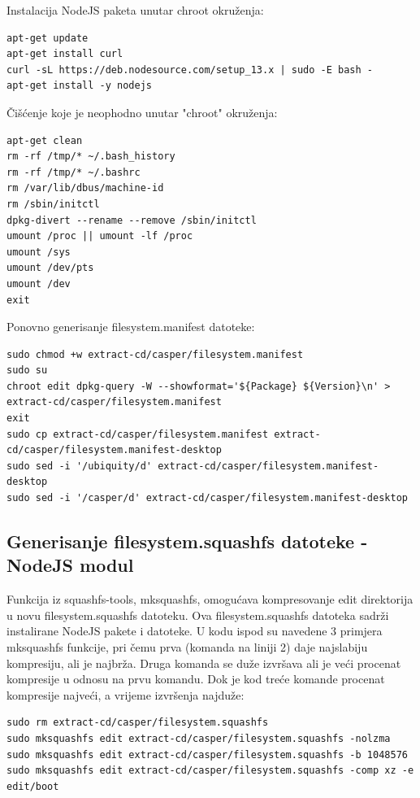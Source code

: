 \documentclass[12pt,vi]{mitthesis}
\begin{document}
\noindent
Instalacija NodeJS paketa unutar chroot okruženja:
\begin{lstlisting}[style=BashInputStyle]
apt-get update
apt-get install curl
curl -sL https://deb.nodesource.com/setup_13.x | sudo -E bash -
apt-get install -y nodejs
\end{lstlisting}

\noindent
Čišćenje koje je neophodno unutar "chroot" okruženja:
\begin{lstlisting}[style=BashInputStyle]
apt-get clean
rm -rf /tmp/* ~/.bash_history
rm -rf /tmp/* ~/.bashrc
rm /var/lib/dbus/machine-id
rm /sbin/initctl
dpkg-divert --rename --remove /sbin/initctl
umount /proc || umount -lf /proc
umount /sys
umount /dev/pts
umount /dev
exit
\end{lstlisting}

\noindent
Ponovno generisanje filesystem.manifest datoteke:
\begin{lstlisting}[style=BashInputStyle]
sudo chmod +w extract-cd/casper/filesystem.manifest
sudo su
chroot edit dpkg-query -W --showformat='${Package} ${Version}\n' > extract-cd/casper/filesystem.manifest
exit
sudo cp extract-cd/casper/filesystem.manifest extract-cd/casper/filesystem.manifest-desktop
sudo sed -i '/ubiquity/d' extract-cd/casper/filesystem.manifest-desktop
sudo sed -i '/casper/d' extract-cd/casper/filesystem.manifest-desktop
\end{lstlisting}

\subsection*{Generisanje filesystem.squashfs datoteke - NodeJS modul}
\noindent
Funkcija iz squashfs-tools, mksquashfs, omogućava kompresovanje edit direktorija u novu filesystem.squashfs datoteku. Ova filesystem.squashfs datoteka sadrži instalirane NodeJS pakete i datoteke. U kodu ispod su navedene 3 primjera mksquashfs funkcije, pri čemu prva (komanda na liniji 2) daje najslabiju kompresiju, ali je najbrža. Druga komanda se duže izvršava ali je veći procenat kompresije u odnosu na prvu komandu. Dok je kod treće komande procenat kompresije najveći, a vrijeme izvršenja najduže:
\begin{lstlisting}[style=BashInputStyle]
sudo rm extract-cd/casper/filesystem.squashfs
sudo mksquashfs edit extract-cd/casper/filesystem.squashfs -nolzma 
sudo mksquashfs edit extract-cd/casper/filesystem.squashfs -b 1048576
sudo mksquashfs edit extract-cd/casper/filesystem.squashfs -comp xz -e edit/boot
\end{lstlisting}
\end{document}
